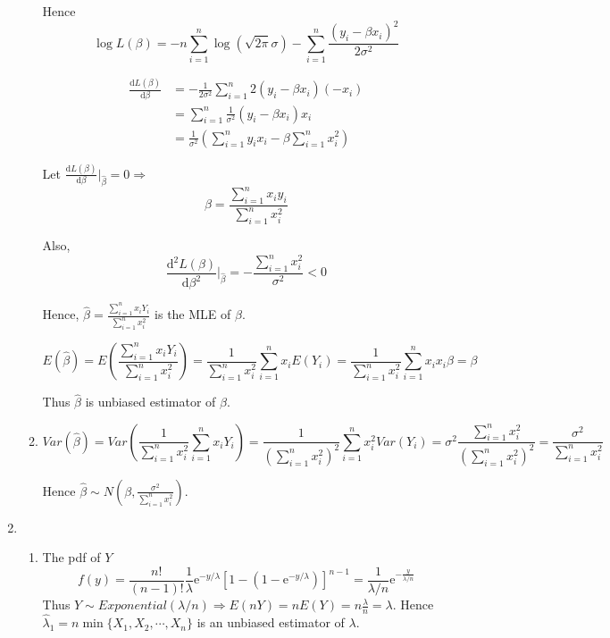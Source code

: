 \documentclass{article}
\begin{document}
\begin{enumerate}[leftmargin = 0 em, label = \arabic*., font = \bfseries]
\begin{enumerate}[start = 2]
		Hence 
		\[\log L(\beta) = - n \sum_{i=1}^n \log(\sqrt{2 \pi} \sigma) - \sum_{i=1}^n \frac{(y_i - \beta x_i)^2}{2 \sigma^2}\]

		\begin{align*}
		\frac{\mathrm{d}L(\beta)}{\mathrm{d} \beta} &= -\frac{1}{2 \sigma^2} \sum_{i=1}^n 2 (y_i - \beta x_i) (-x_i)\\
		& =  \sum_{i=1}^n \frac{1}{\sigma^2} (y_i - \beta x_i) x_i\\
		&= \frac{1}{\sigma^2} (\sum_{i=1}^n y_i x_i - \beta \sum_{i=1}^n x_i^2)
		\end{align*}

		Let $\frac{\mathrm{d}L(\beta)}{\mathrm{d}\beta} \big|_{\hat{\beta}} = 0 \Rightarrow $
		\[\hat{\beta} = \frac{\sum_{i=1}^n x_i y_i}{\sum_{i=1}^n x_i^2}\]

		Also, 
		\[\frac{\mathrm{d}^2 L(\beta)}{\mathrm{d}\beta^2} \big|_{\hat{\beta}}= -\frac{\sum_{i=1}^n x_i^2}{\sigma^2} < 0 \]

		Hence, $\hat{\beta} = \frac{\sum_{i=1}^n x_i Y_i}{\sum_{i=1}^n x_i^2}$ is the MLE of $\beta$.

		\[E(\hat{\beta}) = E\left(\frac{\sum_{i=1}^n x_i Y_i}{\sum_{i=1}^n x_i^2}\right) = \frac{1}{\sum_{i=1}^n x_i^2} \sum_{i=1}^n x_i E(Y_i) = \frac{1}{\sum_{i=1}^n x_i^2} \sum_{i=1}^n x_i x_i \beta = \beta\]

		Thus $\hat{\beta}$ is unbiased estimator of $\beta$.

		\item 
		\[Var(\hat{\beta}) = Var(\frac{1}{\sum_{i=1}^n x_i^2} \sum_{i=1}^n x_i Y_i) = \frac{1}{(\sum_{i=1}^n x_i^2)^2} \sum_{i=1}^n x_i^2 Var(Y_i) = \sigma^2 \frac{\sum_{i=1}^n x_i^2}{(\sum_{i=1}^n x_i^2)^2} = \frac{\sigma^2}{\sum_{i=1}^n x_i^2}\]

		Hence $\hat{\beta} \sim N(\beta , \frac{\sigma^2}{\sum_{i=1}^n x_i^2})$.
		
	\end{enumerate}

	\item 
	\begin{enumerate}
		\item 
		The pdf of $Y$
		\[f(y) = \frac{n!}{(n-1)!} \frac{1}{\lambda} \mathrm{e}^{-y/\lambda} \left[1 - (1 - \mathrm{e}^{-y/\lambda})\right]^{n-1} = \frac{1}{\lambda / n} \mathrm{e}^{- \frac{y}{\lambda/n}}\]
		Thus $Y \sim Exponential(\lambda / n) \Rightarrow E(n Y) = n E(Y) = n \frac{\lambda}{n} = \lambda$. Hence 
		$\hat{\lambda}_1 = n \min \{X_1, X_2, \cdots, X_n\} $ is an unbiased estimator of $\lambda$.


\end{enumerate}
\end{enumerate}
\end{document}
